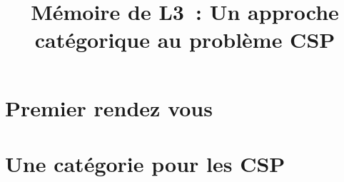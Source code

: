 \documentclass[12pt]{article}
\title{Mémoire de L3~: Un approche catégorique au problème CSP}
\author{}
\begin{document}
\maketitle


\section{Premier rendez vous}


\section{Une catégorie pour les CSP}

\end{document}
